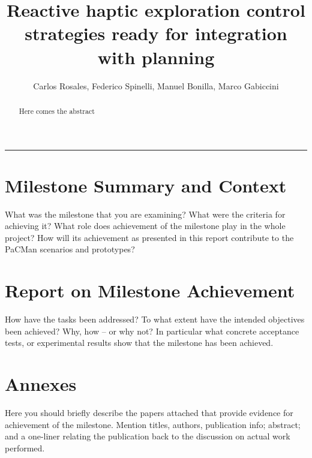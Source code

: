 \documentclass[a4paper,11pt,pdf]{pacmanreport}
\title{Reactive haptic exploration control strategies ready for integration with planning}
\author{Carlos Rosales, Federico Spinelli, Manuel Bonilla, Marco Gabiccini}
\begin{document}
\maketitle

\begin{abstract}
\noindent Here comes the abstract
\end{abstract}


\vspace{.2em}
\hrule

\vspace{.2em}
\footnotesize

\tableofcontents

\normalsize

\newpage

\section{Milestone Summary and Context}

What was the milestone that you are examining? What were the criteria for achieving it? What role does achievement of the milestone play in the whole project? How will its achievement as presented in this report contribute to the PaCMan scenarios and prototypes? 


\newpage

\section{Report on Milestone Achievement}

How have the tasks been addressed? To what extent have the intended objectives been achieved? Why, how -- or why not? In particular what concrete acceptance tests, or experimental results show that the milestone has been achieved.


\section{Annexes}

Here you should briefly describe the papers attached that provide evidence for achievement of the milestone. Mention titles, authors, publication info; abstract; and a one-liner relating the publication back to the discussion on actual work performed. 



%
%
\end{document}
